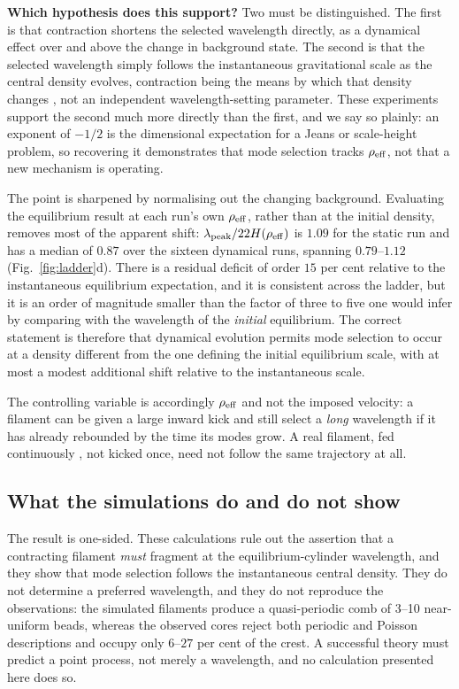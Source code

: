 \documentclass[usenatbib,twoside,twocolumn]{mnras}
\begin{document}
\smallskip\noindent\textbf{Which hypothesis does this support?} Two must be distinguished. The first is that contraction shortens the selected wavelength directly, as a dynamical effect over and above the change in background state. The second is that the selected wavelength simply follows the instantaneous gravitational scale as the central density evolves, contraction being the means by which that density changes , not an independent wavelength-setting parameter. These experiments support the second much more directly than the first, and we say so plainly: an exponent of $-1/2$ is the dimensional expectation for a Jeans or scale-height problem, so recovering it demonstrates that mode selection tracks $\rho_{\rm eff}$, not that a new mechanism is operating.

The point is sharpened by normalising out the changing background. Evaluating the equilibrium result at each run's own $\rho_{\rm eff}$, rather than at the initial density, removes most of the apparent shift: $\lambda_{\rm peak}/22H(\rho_{\rm eff})$ is $1.09$ for the static run and has a median of $0.87$ over the sixteen dynamical runs, spanning $0.79$--$1.12$ (Fig.~\ref{fig:ladder}d). There is a residual deficit of order $15$ per cent relative to the instantaneous equilibrium expectation, and it is consistent across the ladder, but it is an order of magnitude smaller than the factor of three to five one would infer by comparing with the wavelength of the \emph{initial} equilibrium. The correct statement is therefore that dynamical evolution permits mode selection to occur at a density different from the one defining the initial equilibrium scale, with at most a modest additional shift relative to the instantaneous scale.

The controlling variable is accordingly $\rho_{\rm eff}$ and not the imposed velocity: a filament can be given a large inward kick and still select a \emph{long} wavelength if it has already rebounded by the time its modes grow. A real filament, fed continuously , not kicked once, need not follow the same trajectory at all.

\subsection{What the simulations do and do not show}
\label{sec:simsummary}

The result is one-sided. These calculations rule out the assertion that a contracting filament \emph{must} fragment at the equilibrium-cylinder wavelength, and they show that mode selection follows the instantaneous central density. They do not determine a preferred wavelength, and they do not reproduce the observations: the simulated filaments produce a quasi-periodic comb of 3--10 near-uniform beads, whereas the observed cores reject both periodic and Poisson descriptions and occupy only $6$--$27$ per cent of the crest. A successful theory must predict a point process, not merely a wavelength, and no calculation presented here does so.
\end{document}

